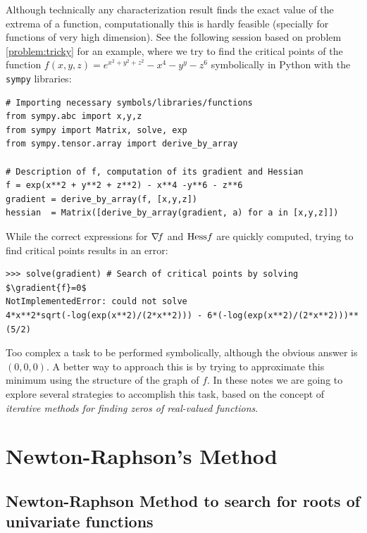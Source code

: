 
Although technically any characterization result finds the exact value of the extrema of a function, computationally this is hardly feasible (specially for functions of very high dimension).  See the following session based on problem \ref{problem:tricky} for an example, where we try to find the critical points of the function $f(x,y,z)=e^{x^2+y^2+z^2}-x^4-y^y-z^6$ symbolically in Python with the \texttt{sympy} libraries:

\begin{verbatim}
# Importing necessary symbols/libraries/functions
from sympy.abc import x,y,z
from sympy import Matrix, solve, exp
from sympy.tensor.array import derive_by_array

# Description of f, computation of its gradient and Hessian
f = exp(x**2 + y**2 + z**2) - x**4 -y**6 - z**6
gradient = derive_by_array(f, [x,y,z])
hessian  = Matrix([derive_by_array(gradient, a) for a in [x,y,z]])
\end{verbatim}
While the correct expressions for $\mathop{\nabla\! {f}}$ and $\mathop{\mathrm{Hess}{f}}$ are quickly computed, trying to find critical points results in an error:
\begin{verbatim}
>>> solve(gradient) # Search of critical points by solving $\gradient{f}=0$
NotImplementedError: could not solve 
4*x**2*sqrt(-log(exp(x**2)/(2*x**2))) - 6*(-log(exp(x**2)/(2*x**2)))**(5/2)
\end{verbatim}

Too complex a task to be performed symbolically, although the obvious answer is $(0,0,0)$.  A better way to approach this is by trying to approximate this minimum using the structure of the graph of $f$.  In these notes we are going to explore several strategies to accomplish this task, based on the concept of \emph{iterative methods for finding zeros of real-valued functions}.

\section{Newton-Raphson's Method}

\subsection{Newton-Raphson Method to search for roots of univariate functions}

